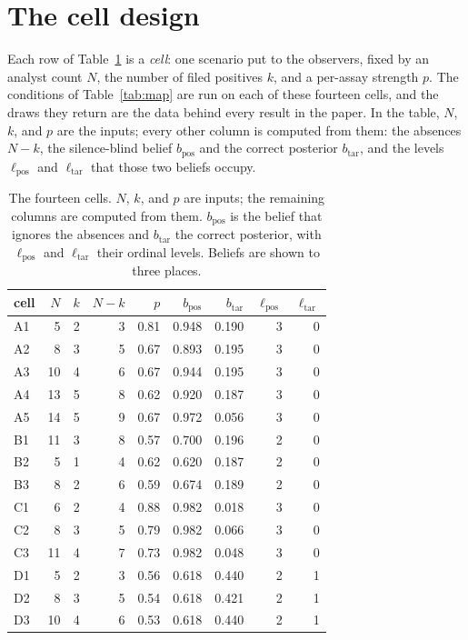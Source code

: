\documentclass{article}
\theoremstyle{plain}
\theoremstyle{definition}
\theoremstyle{remark}
\newcommand{\bpos}{b_{\mathrm{pos}}}
\newcommand{\btar}{b_{\mathrm{tar}}}         %
\newcommand{\qz}{\btar}                        %
\newcommand{\ltar}{\ell_{\mathrm{tar}}}        %
\newcommand{\lcor}{\ltar}                       %
\newcommand{\lpos}{\ell_{\mathrm{pos}}}
\begin{document}
\clearpage
\appendix

\section{The cell design}\label{app:cells}

Each row of Table~\ref{tab:cells} is a \emph{cell}: one scenario put to the
observers, fixed by an analyst count $N$, the number of filed positives $k$, and
a per-assay strength $p$. The conditions of Table~\ref{tab:map} are run on each
of these fourteen cells, and the draws they return are the data behind every
result in the paper. In the table, $N$, $k$, and $p$ are the inputs; every other
column is computed from them: the absences $N - k$, the silence-blind belief
$\bpos$ and the correct posterior $\qz$, and the levels $\lpos$
and $\lcor$ that those two beliefs occupy.


\begin{table}[H]
  \caption{The fourteen cells. $N$, $k$, and $p$ are inputs; the remaining
  columns are computed from them. $\bpos$ is the belief that ignores the
  absences and $\qz$ the correct posterior, with $\lpos$ and
  $\lcor$ their ordinal levels. Beliefs are shown to three
  places.}
  \label{tab:cells}
  \centering
  \small
  \begin{tabular}{lrrrrrrrr}
    \toprule
    cell & $N$ & $k$ & $N-k$ & $p$ & $\bpos$ & $\qz$ & $\lpos$ & $\lcor$ \\
    \midrule
    A1 &  5 & 2 & 3 & 0.81 & 0.948 & 0.190 & 3 & 0 \\
    A2 &  8 & 3 & 5 & 0.67 & 0.893 & 0.195 & 3 & 0 \\
    A3 & 10 & 4 & 6 & 0.67 & 0.944 & 0.195 & 3 & 0 \\
    A4 & 13 & 5 & 8 & 0.62 & 0.920 & 0.187 & 3 & 0 \\
    A5 & 14 & 5 & 9 & 0.67 & 0.972 & 0.056 & 3 & 0 \\
    \midrule
    B1 & 11 & 3 & 8 & 0.57 & 0.700 & 0.196 & 2 & 0 \\
    B2 &  5 & 1 & 4 & 0.62 & 0.620 & 0.187 & 2 & 0 \\
    B3 &  8 & 2 & 6 & 0.59 & 0.674 & 0.189 & 2 & 0 \\
    \midrule
    C1 &  6 & 2 & 4 & 0.88 & 0.982 & 0.018 & 3 & 0 \\
    C2 &  8 & 3 & 5 & 0.79 & 0.982 & 0.066 & 3 & 0 \\
    C3 & 11 & 4 & 7 & 0.73 & 0.982 & 0.048 & 3 & 0 \\
    \midrule
    D1 &  5 & 2 & 3 & 0.56 & 0.618 & 0.440 & 2 & 1 \\
    D2 &  8 & 3 & 5 & 0.54 & 0.618 & 0.421 & 2 & 1 \\
    D3 & 10 & 4 & 6 & 0.53 & 0.618 & 0.440 & 2 & 1 \\
    \bottomrule
  \end{tabular}
\end{table}
\end{document}
